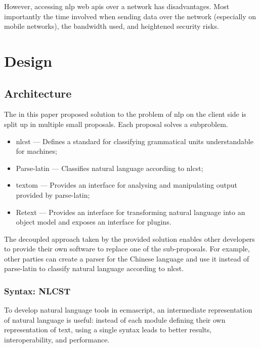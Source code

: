 However, accessing \gls{nlp} web \glspl{api} over a network has
disadvantages. Most importantly the time involved when sending data over
the network (especially on mobile networks), the bandwidth used, and
heightened security risks.

\chapter{Design}\label{design}

\section{Architecture}\label{architecture}

The in this paper proposed solution to the problem of \gls{nlp} on the
client side is split up in multiple small proposals. Each proposal
solves a subproblem.

\begin{itemize}
\itemsep1pt\parskip0pt
\item
  \gls{nlcst} --- Defines a standard for classifying grammatical units
  understandable for machines;
\item
  Parse-latin --- Classifies natural language according to \gls{nlcst};
\item
  \gls{textom} --- Provides an interface for analysing and manipulating
  output provided by parse-latin;
\item
  Retext --- Provides an interface for transforming natural language
  into an object model and exposes an interface for plugins.
\end{itemize}

The decoupled approach taken by the provided solution enables other
developers to provide their own software to replace one of the
sub-proposals. For example, other parties can create a parser for the
Chinese language and use it instead of parse-latin to classify natural
language according to \gls{nlcst}.

\subsection{Syntax: NLCST}\label{syntax}

To develop natural language tools in \gls{ecmascript}, an intermediate
representation of natural language is useful: instead of each module
defining their own representation of text, using a single syntax leads
to better results, interoperability, and performance.

